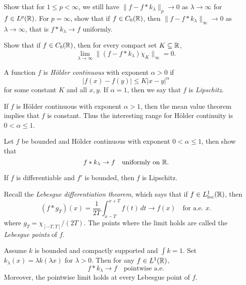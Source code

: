 \begin{exercise}
  Show that for $1 \le p < \infty$,
  we still have
  $\|f - f * k_{\lambda}\|_{p} \to 0$
  as $\lambda \to \infty$ for
  $f \in L^p(\mathbb{R})$.
  For $p = \infty$, show that if
  $f \in C_0(\mathbb{R})$, then
  $\|f - f * k_{\lambda}\|_{\infty} \to 0$
  as $\lambda \to \infty$, that is
  $f * k_{\lambda} \to f$ uniformly.
\end{exercise}

\begin{exercise}
  Show that if $f \in C_b(\mathbb{R})$, then for every
  compact set $K \subseteq \mathbb{R}$,
  \[
    \lim_{\lambda \to \infty}
    \|(f - f * k_{\lambda}) \chi_K\|_{\infty} = 0.
  \]
\end{exercise}

\begin{definition}
  A function $f$ is \emph{H\"older continuous} with exponent $\alpha > 0$ if
  \[
    |f(x) - f(y)| \le  K |x - y|^{\alpha}
  \]
  for some constant $K$ and all $x, y$.
  If $\alpha = 1$, then we say that
  $f$ is \emph{Lipschitz}.
\end{definition}

\begin{remark}
  If $f$ is H\"older continuous with
  exponent $\alpha > 1$, then the mean value
  theorem implies that $f$ is constant.
  Thus the interesting
  range for
  H\"older continuity
  is $0 < \alpha \le 1$.
\end{remark}

\begin{exercise}
  Let $f$ be bounded and
  H\"older continuous with exponent $0 < \alpha \le 1$,
  then show that
  \[
    f * k_{\lambda} \to f \quad \text{uniformly on $\mathbb{R}$}.
  \]
\end{exercise}

\begin{remark}
  If $f$ is differentiable and $f'$
  is bounded, then $f$ is Lipschitz.
\end{remark}

\begin{remark}
  Recall the \emph{Lebesgue differentiation theorem}, which
  says that if $f \in L^1_{\mathrm{loc}}(\mathbb{R})$, then
  \[
    (f * g_T)(x)
    = \frac{1}{2T} \int_{x - T}^{x + T} f(t)\, dt
    \longrightarrow f(x)
    \quad \text{for a.e. $x$}.
  \]
  where $g_T = \chi_{[-T, T]}/(2T)$. The
  points where the limit holds are called
  the \emph{Lebesgue points} of $f$.
\end{remark}

\begin{theorem}
  Assume $k$ is bounded and compactly
  supported and
  $\int k = 1$. Set
  $k_\lambda(x) = \lambda k(\lambda x)$
  for $\lambda > 0$.
  Then for any $f \in L^1(\mathbb{R})$,
  \[
    f * k_\lambda \to f \quad
    \text{pointwise a.e.}
  \]
  Moreover, the pointwise limit holds
  at every Lebesgue point of $f$.
\end{theorem}

